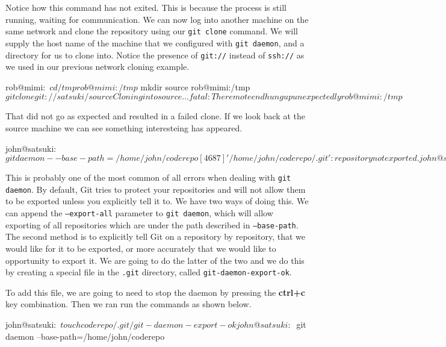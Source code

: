 
Notice how this command has not exited.
This is because the process is still running, waiting for communication.
We can now log into another machine on the same network and clone the repository using our \texttt{git clone} command.
We will supply the host name of the machine that we configured with \texttt{git daemon}, and a directory for us to clone into.
Notice the presence of \texttt{git://} instead of \texttt{ssh://} as we used in our previous network cloning example.

\begin{code}
rob@mimi:~$ cd /tmp
rob@mimi:/tmp$ mkdir source
rob@mimi:/tmp$ git clone git://satsuki/ source
Cloning into source...
fatal: The remote end hung up unexpectedly
rob@mimi:/tmp$ 
\end{code}

That did not go as expected and resulted in a failed clone.
If we look back at the source machine we can see something interesteing has appeared.

\begin{code}
john@satsuki:~$ git daemon --base-path=/home/john/coderepo
[4687] '/home/john/coderepo/.git': repository not exported.
john@satsuki:~$
\end{code}

This is probably one of the most common of all errors when dealing with \texttt{git daemon}.
By default, Git tries to protect your repositories and will not allow them to be exported unless you explicitly tell it to.
We have two ways of doing this.
We can append the \texttt{--export-all} parameter to \texttt{git daemon}, which will allow exporting of all repositories which are under the path described in \texttt{--base-path}.
The second method is to explicitly tell Git on a repository by repository, that we would like for it to be exported, or more accurately that we would like to opportunity to export it.
We are going to do the latter of the two and we do this by creating a special file in the \texttt{.git} directory, called \texttt{git-daemon-export-ok}.

To add this file, we are going to need to stop the daemon by pressing the \textbf{ctrl+c} key combination.
Then we ran run the commands as shown below.

\begin{code}
john@satsuki:~$ touch coderepo/.git/git-daemon-export-ok
john@satsuki:~$ git daemon --base-path=/home/john/coderepo

\end{code}

